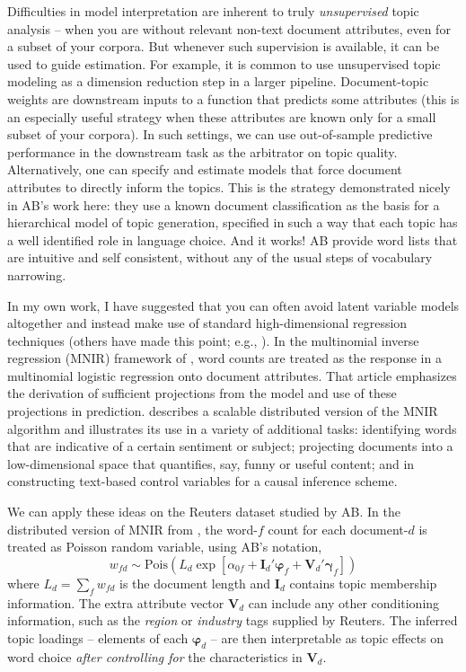 \documentclass[12pt]{article}
\newcommand{\bs}[1]{\boldsymbol{#1}}
\newcommand{\mr}[1]{\mathrm{#1}}
\newcommand{\bm}[1]{\mathbf{#1}}
\begin{document}
Difficulties in model interpretation are inherent to truly {\it unsupervised}
topic analysis -- when you are without relevant non-text document attributes,
even for a subset of your corpora.  But whenever such supervision is
available, it can be used to guide estimation.  For example, it is common to
use unsupervised topic modeling as a dimension reduction step in a larger
pipeline.  Document-topic weights  are downstream inputs to a function that
predicts some  attributes (this is an especially useful strategy when
these attributes are  known only for a small subset of your corpora).  In such
settings, we can use out-of-sample predictive performance in the downstream
task as the arbitrator on topic quality.  Alternatively, one can specify and
estimate  models that force document attributes to directly inform the topics.
This is the strategy demonstrated nicely in AB's work here: they use a known
document classification as the basis for a hierarchical model of topic
generation, specified in such a way that each topic has a well identified role
in language choice.  And it works! AB provide word lists that are intuitive
and self consistent, without any of the usual steps of vocabulary narrowing.

In my own work, I have suggested that  you can often avoid  latent variable models altogether and instead make use of standard high-dimensional regression techniques (others have made this point; e.g., \citealt{jia2014concise}).  In the multinomial inverse regression (MNIR) framework of \cite{taddy_multinomial_2013},  word counts  are treated as the response in a multinomial logistic regression onto document attributes.  That article emphasizes the derivation of sufficient  projections from the model and use of these projections in prediction.  \cite{taddy_distributed_2015} 
describes a scalable distributed version of the MNIR algorithm and illustrates its use in a variety of additional tasks: identifying words that are indicative of a certain sentiment or subject; projecting documents into a low-dimensional space that quantifies, say, funny or useful content; and in constructing text-based control variables for a causal inference scheme.

We can apply these ideas on the Reuters dataset studied by AB.  In the
distributed version of MNIR from \cite{taddy_distributed_2015}, the word-$f$
count for each document-$d$ is treated as Poisson random variable, using AB's notation, \begin{equation}\label{eq:taddyglm} w_{fd} \sim
\mr{Pois}\left( L_d \exp\left[ \alpha_{0f} + \bm{I}_d'\bs{\varphi}_f
+ \bm{V}_d'\bs{\gamma}_f\right]\right) \end{equation} where $L_d = \sum_f
w_{fd}$ is the document length and $\bm{I}_d$ contains topic membership
information.  The extra attribute vector $\bm{V}_d$ can include any other 
conditioning information, such as the {\it region} or {\it industry}
tags supplied by Reuters.  The inferred
topic loadings -- elements of each $\bs{\varphi}_d$ -- are then interpretable
as topic effects on word choice {\it after controlling for} the characteristics in $\bm{V}_d$.  
\end{document}
